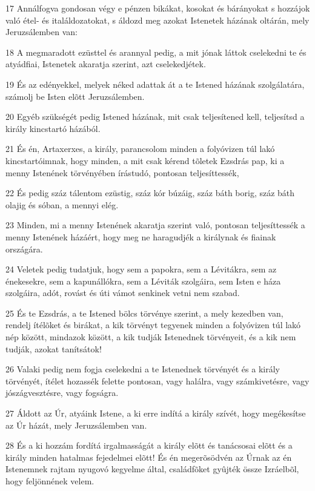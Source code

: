 {\par 17 Annálfogva gondosan végy e pénzen bikákat, kosokat és bárányokat s hozzájok való étel- és italáldozatokat, s áldozd meg azokat Istenetek házának oltárán, mely Jeruzsálemben van:
\par 18 A megmaradott ezüsttel és arannyal pedig, a mit jónak láttok cselekedni te és atyádfiai, Istenetek akaratja szerint, azt cselekedjétek.
\par 19 És az edényekkel, melyek néked adattak át a te Istened házának szolgálatára, számolj be Isten elõtt Jeruzsálemben.
\par 20 Egyéb szükségét pedig Istened házának, mit csak teljesítened kell, teljesítsd a király kincstartó házából.
\par 21 És én, Artaxerxes, a király, parancsolom minden a folyóvizen túl lakó kincstartóimnak, hogy minden, a mit csak kérend tõletek Ezsdrás pap, ki a menny Istenének törvényében írástudó, pontosan teljesíttessék,
\par 22 És pedig száz tálentom ezüstig, száz kór búzáig, száz báth borig, száz báth olajig és sóban, a mennyi elég.
\par 23 Minden, mi a menny Istenének akaratja szerint való, pontosan teljesíttessék a menny Istenének házáért, hogy meg ne haragudjék a királynak és fiainak országára.
\par 24 Veletek pedig tudatjuk, hogy sem a papokra, sem a Lévitákra, sem az énekesekre, sem a kapunállókra, sem a Léviták szolgáira, sem Isten e háza szolgáira, adót, rovást és úti vámot senkinek vetni nem szabad.
\par 25 És te Ezsdrás, a te Istened bölcs törvénye szerint, a mely kezedben van, rendelj ítélõket és birákat, a kik törvényt tegyenek minden a folyóvizen túl lakó nép között, mindazok között, a kik tudják Istenednek törvényeit, és a kik nem tudják, azokat tanítsátok!
\par 26 Valaki pedig nem fogja cselekedni a te Istenednek törvényét és a király törvényét, ítélet hozassék felette pontosan, vagy halálra, vagy számkivetésre, vagy jószágvesztésre, vagy fogságra.
\par 27 Áldott az Úr, atyáink Istene, a ki erre indítá a király szívét, hogy megékesítse az Úr házát, mely Jeruzsálemben van.
\par 28 És a ki hozzám fordítá irgalmasságát a király elõtt és tanácsosai elõtt és a király minden hatalmas fejedelmei elõtt! És én megerõsödvén az Úrnak az én Istenemnek rajtam nyugovó kegyelme által, családfõket gyûjték össze Izráelbõl, hogy feljönnének velem.

}
